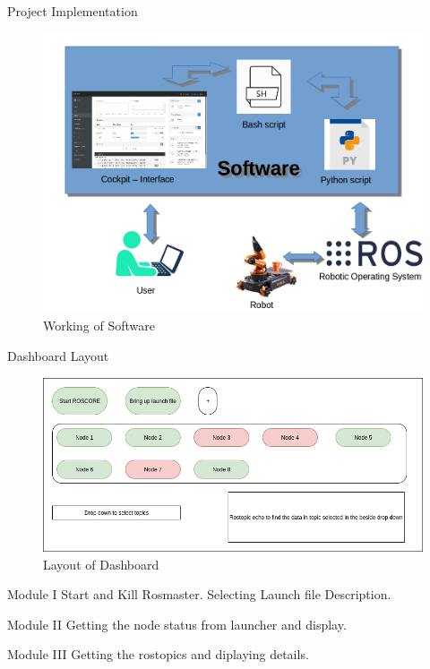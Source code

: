 \documentclass[aspectratio=169]{beamer}
\begin{document}
\begin{frame}{Project Implementation}
\begin{figure}
  \includegraphics[width=0.6\linewidth]{Working.png}
  \caption{Working of Software}
  \label{fig: Implementation}
\end{figure}
\end{frame}

\begin{frame}{Dashboard Layout}
\begin{figure}
  \includegraphics[width=0.8\linewidth]{Layout.png}
  \caption{Layout of Dashboard}
  \label{fig: Layout}
\end{figure}
\end{frame}

\begin{frame}{Module I}
Start and Kill Rosmaster.
Selecting Launch file Description.
\end{frame}

\begin{frame}{Module II}
Getting the node status from launcher and display.
\end{frame}

\begin{frame}{Module III}
Getting the rostopics and diplaying details.
\end{frame}
\end{document}

